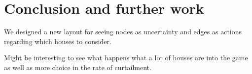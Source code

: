 \section{Conclusion and further work} %
\label{sec:further_work}


We designed a new layout for seeing nodes as uncertainty and edges as actions
regarding which houses to consider.

Might be interesting to see what happens what a lot of houses
are into the game as well as more choice in the rate of curtailment.


